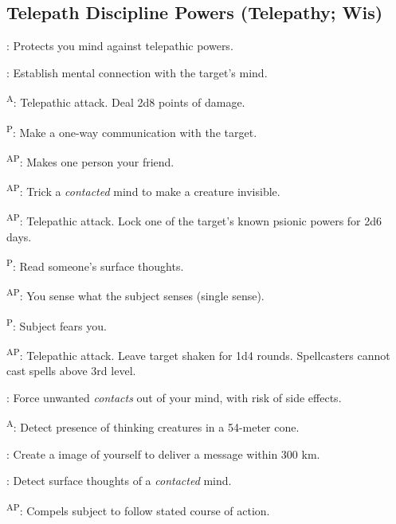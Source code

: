 \subsection{Telepath Discipline Powers {\normalsize(Telepathy; Wis)}}
\begin{enumerate*}
\item {}: Protects you mind against telepathic powers.

      : Establish mental connection with the target's mind.

      \textsuperscript{A}: Telepathic attack. Deal 2d8 points of damage.

      \textsuperscript{P}: Make a one-way communication with the target.

\item {}\textsuperscript{AP}: Makes one person your friend.

      \textsuperscript{AP}: Trick a \emph{contacted} mind to make a creature invisible.

      \textsuperscript{AP}: Telepathic attack. Lock one of the target's known psionic powers for 2d6 days.

      \textsuperscript{P}: Read someone's surface thoughts.

      \textsuperscript{AP}: You sense what the subject senses (single sense).

\item {}\textsuperscript{P}: Subject fears you.

      \textsuperscript{AP}: Telepathic attack. Leave target shaken for 1d4 rounds. Spellcasters cannot cast spells above 3rd level.

      : Force unwanted \emph{contacts} out of your mind, with risk of side effects.

      \textsuperscript{A}: Detect presence of thinking creatures in a 54-meter cone.

      : Create a image of yourself to deliver a message within 300 km.

      : Detect surface thoughts of a \emph{contacted} mind.

      \textsuperscript{AP}: Compels subject to follow stated course of action.


\end{enumerate*}
